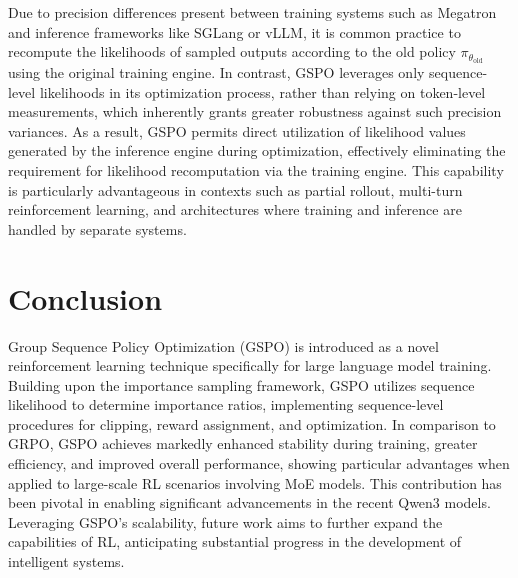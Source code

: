 Due to precision differences present between training systems such as Megatron and inference frameworks like SGLang or vLLM, it is common practice to recompute the likelihoods of sampled outputs according to the old policy $\pi_{\theta_\text{old}}$ using the original training engine. In contrast, GSPO leverages only sequence-level likelihoods in its optimization process, rather than relying on token-level measurements, which inherently grants greater robustness against such precision variances. As a result, GSPO permits direct utilization of likelihood values generated by the inference engine during optimization, effectively eliminating the requirement for likelihood recomputation via the training engine. This capability is particularly advantageous in contexts such as partial rollout, multi-turn reinforcement learning, and architectures where training and inference are handled by separate systems.

\section{Conclusion}

Group Sequence Policy Optimization (GSPO) is introduced as a novel reinforcement learning technique specifically for large language model training. Building upon the importance sampling framework, GSPO utilizes sequence likelihood to determine importance ratios, implementing sequence-level procedures for clipping, reward assignment, and optimization. In comparison to GRPO, GSPO achieves markedly enhanced stability during training, greater efficiency, and improved overall performance, showing particular advantages when applied to large-scale RL scenarios involving MoE models. This contribution has been pivotal in enabling significant advancements in the recent Qwen3 models. Leveraging GSPO's scalability, future work aims to further expand the capabilities of RL, anticipating substantial progress in the development of intelligent systems.

